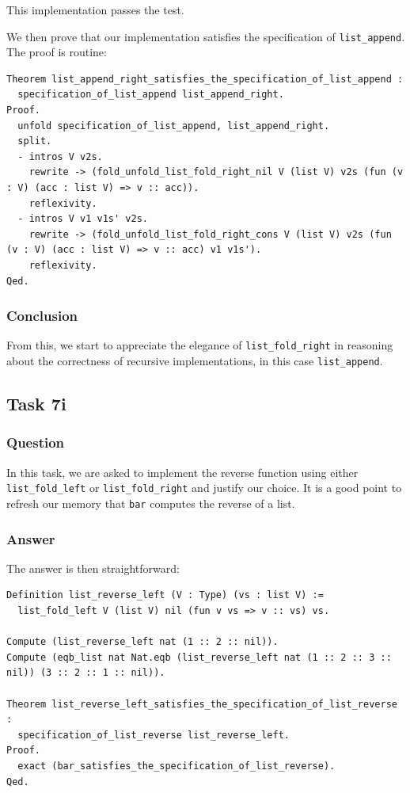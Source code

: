 \documentclass{article}
\begin{document}
This implementation passes the test.

We then prove that our implementation satisfies the specification of \texttt{list\_append}. The proof is routine:

\begin{lstlisting}
Theorem list_append_right_satisfies_the_specification_of_list_append :
  specification_of_list_append list_append_right.
Proof.
  unfold specification_of_list_append, list_append_right.
  split.
  - intros V v2s.
    rewrite -> (fold_unfold_list_fold_right_nil V (list V) v2s (fun (v : V) (acc : list V) => v :: acc)).
    reflexivity.
  - intros V v1 v1s' v2s.
    rewrite -> (fold_unfold_list_fold_right_cons V (list V) v2s (fun (v : V) (acc : list V) => v :: acc) v1 v1s').
    reflexivity.
Qed.
\end{lstlisting}

\subsubsection{Conclusion}
From this, we start to appreciate the elegance of \texttt{list\_fold\_right} in reasoning about the correctness of recursive implementations, in this case \texttt{list\_append}.

\subsection{Task 7i}

\subsubsection{Question}
In this task, we are asked to implement the reverse function using either \texttt{list\_fold\_left} or \texttt{list\_fold\_right} and justify our choice. It is a good point to refresh our memory that \texttt{bar} computes the reverse of a list.

\subsubsection{Answer}
The answer is then straightforward:

\begin{lstlisting}
Definition list_reverse_left (V : Type) (vs : list V) :=
  list_fold_left V (list V) nil (fun v vs => v :: vs) vs.

Compute (list_reverse_left nat (1 :: 2 :: nil)).
Compute (eqb_list nat Nat.eqb (list_reverse_left nat (1 :: 2 :: 3 :: nil)) (3 :: 2 :: 1 :: nil)).

Theorem list_reverse_left_satisfies_the_specification_of_list_reverse :
  specification_of_list_reverse list_reverse_left.
Proof.
  exact (bar_satisfies_the_specification_of_list_reverse).
Qed.
\end{lstlisting}
\end{document}
